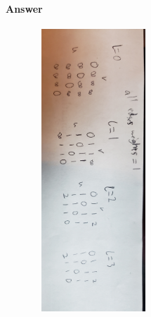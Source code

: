 \documentclass{article}
\begin{document}
\paragraph{Answer}

\includegraphics[width=250,height=400,keepaspectratio,angle=90]{q6Walkthrough.jpg}
\end{document}
